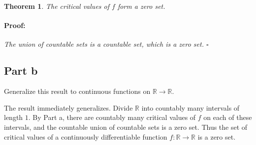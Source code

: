 \documentclass{article}
\newenvironment{proof}{\paragraph{Proof:}}{\hfill$\square$}
\newtheorem{theorem}{Theorem}
\newcommand{\R}{\mathbb{R}}
\begin{document}
\begin{theorem}
The critical values of $f$ form a zero set.
\begin{proof}
The union of countable sets is a countable set, which is a zero set.
\end{proof}
\end{theorem}

\subsection*{Part b}

Generalize this result to continuous functions on $\R \rightarrow \R$.

The result immediately generalizes. Divide $\R$ into countably many intervals of length $1$. By Part a, there are countably many critical values of $f$ on each of these intervals, and the countable union of countable sets is a zero set. Thus the set of critical values of a continuously differentiable function $f: \R \rightarrow \R$ is a zero set. 
\end{document}
